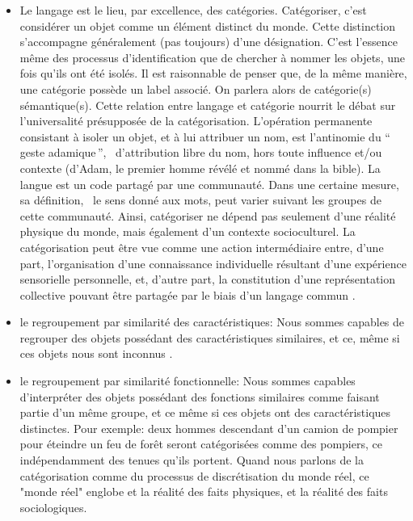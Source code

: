 \begin{itemize}

\item Le langage est le lieu, par excellence, des catégories. Catégoriser, c'est considérer un objet comme un élément distinct du monde. Cette distinction s'accompagne généralement (pas toujours) d'une désignation. C'est l'essence même des processus d'identification que de chercher à nommer les objets, une fois qu'ils ont été isolés. Il est raisonnable de penser que, de la même manière, une catégorie possède un label associé. On parlera alors de catégorie(s) sémantique(s). Cette relation entre langage et catégorie nourrit le débat sur l'universalité présupposée de la catégorisation. L'opération permanente consistant à isoler un objet, et à lui attribuer un nom, est l'antinomie du ``\,geste adamique\,'', \ie~d'attribution libre du nom, hors toute influence et/ou contexte (d'Adam, le premier homme révélé et nommé dans la bible). La langue est un code partagé par une communauté. Dans une certaine mesure, sa définition, \ie~le sens donné aux mots, peut varier suivant les groupes de cette communauté. Ainsi, catégoriser ne dépend pas seulement d'une réalité physique du monde, mais également d'un contexte socioculturel. La catégorisation peut être vue comme une action intermédiaire entre, d'une part, l'organisation d'une connaissance individuelle résultant d'une expérience sensorielle personnelle, et, d'autre part, la constitution d'une représentation collective pouvant être partagée par le biais d'un langage commun \citep{dubois2006cognitive}.
\item le regroupement par similarité des caractéristiques: Nous sommes capables de regrouper des objets possédant des caractéristiques similaires, et ce, même si ces objets nous sont inconnus \citep{fried1984induction}.
\item le regroupement par similarité fonctionnelle: Nous sommes capables d'interpréter des objets possédant des fonctions similaires comme faisant partie d'un même groupe, et ce même si ces objets ont des caractéristiques distinctes. Pour exemple: deux hommes descendant d'un camion de pompier pour éteindre un feu de forêt seront catégorisées comme des pompiers, ce indépendamment des tenues qu'ils portent. Quand nous parlons de la catégorisation comme du processus de discrétisation du monde réel, ce "monde réel" englobe et la réalité des faits physiques, et la réalité des faits sociologiques.
\end{itemize}



